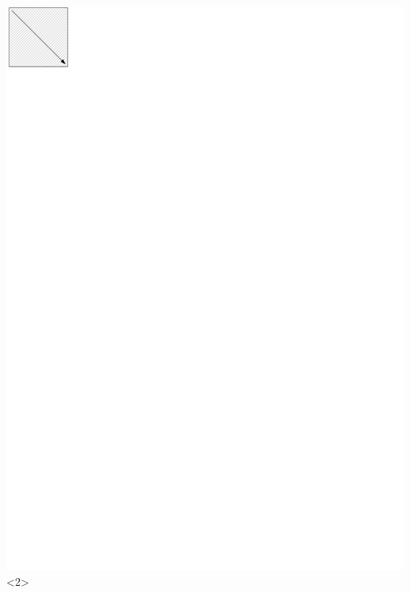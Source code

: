 \documentclass{beamer}
\begin{document}
\begin{frame}
\includegraphics[scale=1.5]{../img/walkingalg1.pdf}<2>

\end{frame}
\end{document}
